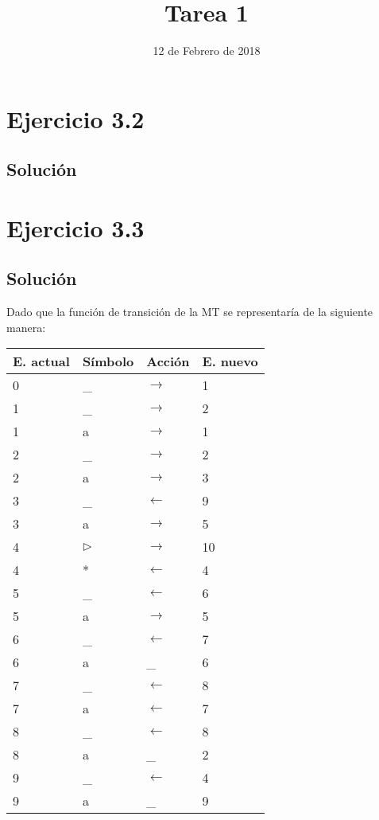 \documentclass[11pt, a4paper, titlepage]{article}
\begin{document}
\title{Tarea 1}
\date{12 de Febrero de 2018}
\maketitle
\newpage



\section{Ejercicio 3.2}
\subsection*{Solución}

\section{Ejercicio 3.3}
\subsection*{Solución}

Dado que la función de transición de la MT se representaría de la siguiente manera:

\begin{center}
  \begin{tabular}{| l | l | l | l |}
    \hline
    E. actual & Símbolo & Acción & E. nuevo \\ \hline
    0 & \_ & $\rightarrow$ & 1 \\ \hline
    1 & \_ & $\rightarrow$ & 2 \\ \hline
    1 & a & $\rightarrow$ & 1 \\ \hline
    2 & \_ & $\rightarrow$ & 2 \\ \hline
    2 & a & $\rightarrow$ & 3 \\ \hline
    3 & \_ & $\leftarrow$ & 9 \\ \hline
    3 & a & $\rightarrow$ & 5 \\ \hline
    4 & $\rhd$ & $\rightarrow$ & 10 \\ \hline
    4 & * & $\leftarrow$ & 4 \\ \hline
    5 & \_ & $\leftarrow$ & 6 \\ \hline
    5 & a & $\rightarrow$ & 5 \\ \hline
    6 & \_ & $\leftarrow$ & 7 \\ \hline
    6 & a & \_ & 6 \\ \hline
    7 & \_ & $\leftarrow$ & 8 \\ \hline
    7 & a & $\leftarrow$ & 7 \\ \hline
    8 & \_ & $\leftarrow$ & 8 \\ \hline
    8 & a & \_ & 2 \\ \hline
    9 & \_ & $\leftarrow$ & 4 \\ \hline
    9 & a & \_ & 9 \\
    \hline
  \end{tabular}
\end{center}
\end{document}
